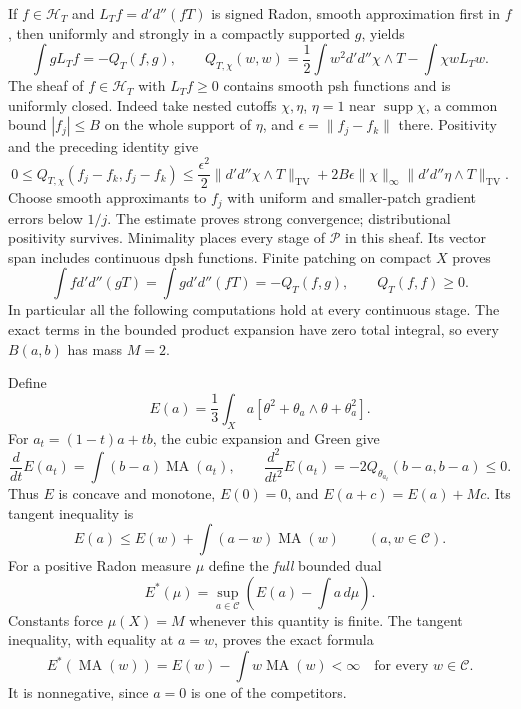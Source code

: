 \documentclass[11pt]{article}
\newcommand{\DD}{d'd''}
\newcommand{\MA}{\operatorname{MA}}
\newcommand{\C}{\mathcal C}
\newcommand{\HH}{\mathscr H}
\theoremstyle{remark}\newtheorem{remark}[theorem]{Remark}
\begin{document}
If $f\in\HH_T$ and $L_Tf=\DD(fT)$ is signed Radon, smooth
approximation first in $f$, then uniformly and strongly in a
compactly supported $g$, yields
\[
 \int gL_Tf=-Q_T(f,g),\qquad
 Q_{T,\chi}(w,w)=\frac12\int w^2\DD\chi\wedge T-\int\chi wL_Tw.
\]
The sheaf of $f\in\HH_T$ with $L_Tf\ge0$ contains smooth psh
functions and is uniformly closed. Indeed take nested cutoffs
$\chi,\eta$, $\eta=1$ near $\operatorname{supp}\chi$,
a common bound $|f_j|\le B$ on the whole support of $\eta$, and
$\epsilon=\|f_j-f_k\|$ there. Positivity and the preceding identity give
\[
 0\le Q_{T,\chi}(f_j-f_k,f_j-f_k)
 \le\frac{\epsilon^2}{2}\|\DD\chi\wedge T\|_{\mathrm{TV}}
 +2B\epsilon\|\chi\|_\infty\|\DD\eta\wedge T\|_{\mathrm{TV}}.
\]
Choose smooth approximants to $f_j$ with uniform and smaller-patch
gradient errors below $1/j$. The estimate proves strong convergence;
distributional positivity survives. Minimality places every stage
of $\mathscr P$ in this sheaf. Its vector span includes continuous
dpsh functions. Finite patching on compact $X$ proves
\[
 \int f\DD(gT)=\int g\DD(fT)=-Q_T(f,g),\qquad Q_T(f,f)\ge0.
\]
In particular all the following computations hold at every
continuous stage. The exact terms in the bounded product expansion
have zero total integral, so every $B(a,b)$ has mass $M=2$.

Define
\[
 E(a)=\frac13\int_X a[\theta^2+\theta_a\wedge\theta+\theta_a^2].
\]
For $a_t=(1-t)a+tb$, the cubic expansion and Green give
\[
 \frac{d}{dt}E(a_t)=\int(b-a)\MA(a_t),\qquad
 \frac{d^2}{dt^2}E(a_t)=-2Q_{\theta_{a_t}}(b-a,b-a)\le0.
\]
Thus $E$ is concave and monotone, $E(0)=0$, and
$E(a+c)=E(a)+Mc$. Its tangent inequality is
\[
 E(a)\le E(w)+\int(a-w)\MA(w)\qquad(a,w\in\C).
\]
For a positive Radon measure $\mu$ define the \emph{full} bounded dual
\[
 E^*(\mu)=\sup_{a\in\C}\left(E(a)-\int a\,d\mu\right).
\]
Constants force $\mu(X)=M$ whenever this quantity is finite.
The tangent inequality, with equality at $a=w$, proves the exact
formula
\begin{equation}\label{dual}
 E^*(\MA(w))=E(w)-\int w\MA(w)<\infty
 \quad\text{for every }w\in\C.
\end{equation}
It is nonnegative, since $a=0$ is one of the competitors.
\end{document}
